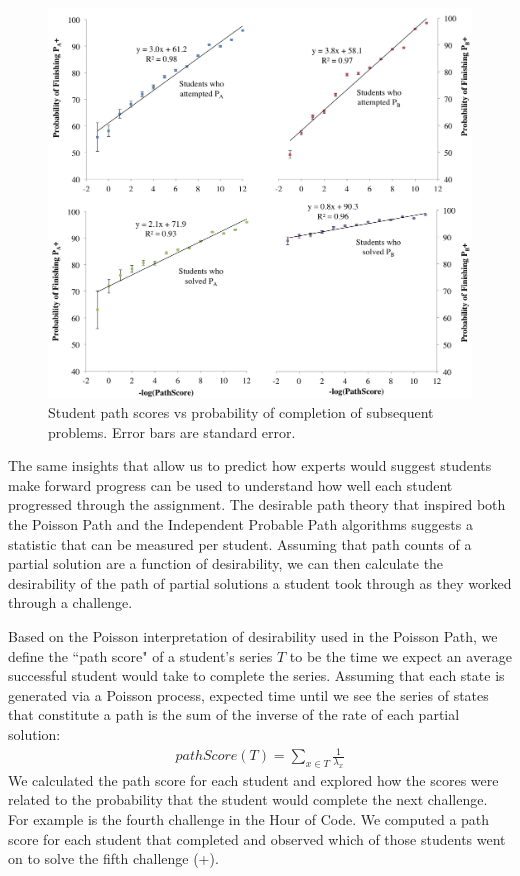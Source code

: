 \begin{figure}[!ht]
\begin{center}
\includegraphics[width=1.0\textwidth]{img/future}

\end{center}
\caption[Poisson path score predicts completion]{Student path scores vs probability of completion of subsequent problems. Error bars are standard error.
 }
\label{fig:predacc}
\end{figure}

The same insights that allow us to predict how experts would suggest students make forward progress can be used to understand how well each student progressed through the assignment. The desirable path theory that inspired both the Poisson Path and the Independent Probable Path algorithms suggests a statistic that can be measured per student. Assuming that path counts of a partial solution are a function of desirability, we can then calculate the desirability of the path of partial solutions a student took through as they worked through a challenge. 

Based on the Poisson interpretation of desirability used in the Poisson Path, we define the ``path score" of a student's series $T$ to be the time we expect an average successful student would take to complete the series. Assuming that each state is generated via a Poisson process, expected time until we see the series of states that constitute a path is the sum of the inverse of the rate of each partial solution:
\begin{align*}
 pathScore(T) = \sum_{x \in T}{\frac{1}{\lambda_x}}
\end{align*}
 We calculated the path score for each student and explored how the scores were related to the probability that the student would complete the next challenge. For example \Pa is the fourth challenge in the Hour of Code. We computed a path score for each student that completed \Pa and observed which of those students went on to solve the fifth challenge (\Pa+).



